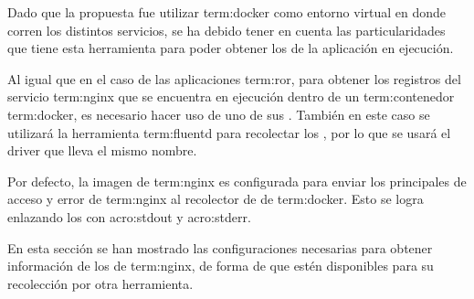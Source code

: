 Dado que la propuesta fue utilizar \gls{term:docker} como entorno virtual
en donde corren los distintos servicios, se ha debido tener en cuenta las
particularidades que tiene esta herramienta para poder obtener los  de
la aplicación en ejecución.

Al igual que en el caso de las aplicaciones \gls{term:ror}, para obtener los
registros del servicio \gls{term:nginx} que se encuentra en ejecución dentro de
un \gls{term:contenedor} \gls{term:docker}, es necesario hacer uso de uno de sus
. También en este caso se utilizará la herramienta
\gls{term:fluentd} para recolectar los , por lo que se usará el driver
que lleva el mismo nombre.

Por defecto, la imagen de \gls{term:nginx} es configurada para enviar los
 principales de acceso y error de \gls{term:nginx} al recolector de
 de \gls{term:docker}. Esto se logra enlazando los  con
\gls{acro:stdout} y \gls{acro:stderr}.

En esta sección se han mostrado las configuraciones necesarias para obtener
información de los  de \gls{term:nginx}, de forma de que estén
disponibles para su recolección por otra herramienta.
